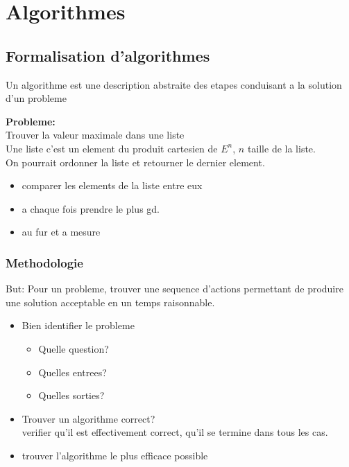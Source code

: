\documentclass[../main.tex]{subfiles}
\begin{document}
\section{Algorithmes}
\subsection{Formalisation d'algorithmes}
\begin{defn}[Algorithme]
	Un algorithme est une description abstraite des etapes conduisant a la solution d'un probleme
\end{defn}

\begin{exemple}
	\textbf{Probleme:}\\
	Trouver la valeur maximale dans une liste\\
	Une liste c'est un element du produit cartesien de $E^{n}$, $n$ taille de la liste.\\
	On pourrait ordonner la liste et retourner le dernier element.\\
	\begin{itemize}
		\item comparer les elements de la liste entre eux\\
		\item a chaque fois prendre le plus gd.\\
		\item au fur et a mesure
	\end{itemize}
	
\end{exemple}

\subsubsection{Methodologie}
But: Pour un probleme, trouver une sequence d'actions permettant de produire une solution acceptable en un temps raisonnable.
\begin{itemize}
	\item Bien identifier le probleme
		\begin{itemize}
			\item Quelle question?\\
			\item Quelles entrees?\\
			\item Quelles sorties?
		\end{itemize}
	\item Trouver un algorithme correct?\\
		verifier qu'il est effectivement correct, qu'il se termine dans tous les cas.\\
	\item trouver l'algorithme le plus efficace possible
\end{itemize}
\end{document}
